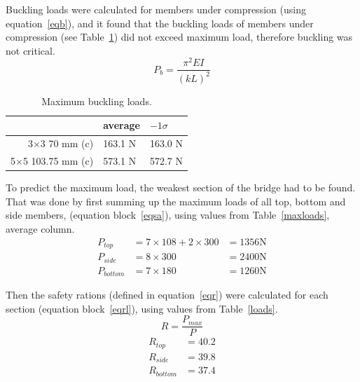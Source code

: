 \documentclass[12pt]{article}
\begin{document}
		Buckling loads were calculated for members under compression (using equation~\ref{eqb}), and it found that the buckling loads of members under compression (see Table~\ref{buck}) did not exceed maximum load, therefore buckling was not critical.
		\begin{equation}
			P_b=\frac{\pi^2 E I}{(kL)^2}
			\label{eqb}
		\end{equation}
		\begin{table}[h!]
			\caption{Maximum buckling loads.}
			\begin{center}
			\begin{tabular}{ | r | l | l | }
				\hline
				& average & $-1\sigma$ \\ \hline
				3$\times$3 70 mm (c) & 163.1 N & 163.0 N \\ \hline
				5$\times$5 103.75 mm (c) & 573.1 N & 572.7 N \\ \hline
			\end{tabular}
			\end{center}
			\label{buck}
		\end{table}

		To predict the maximum load, the weakest section of the bridge had to be found. That was done by first summing up the maximum loads of all top, bottom and side members, (equation block~\ref{eqsa}), using values from Table~\ref{maxloads}, average column.
		\begin{subequations}
			\begin{align}
				P_{top}&=7\times108+2\times300
				&=1356\mathrm{N}\\
				P_{side}&=8\times300
				&=2400\mathrm{N}\\
				P_{bottom}&=7\times180
				&=1260\mathrm{N}
			\end{align}
			\label{eqsa}
		\end{subequations}

		Then the safety rations (defined in equation~\ref{eqr}) were calculated for each section (equation block~\ref{eqrl}), using values from Table~\ref{loads}.
		\begin{equation}
			R=\frac{P_{max}}{P}
			\label{eqr}
		\end{equation}
		\begin{subequations}
			\begin{align}
				R_{top}&=40.2\\
				R_{side}&=39.8\\
				R_{bottom}&=37.4
			\end{align}
			\label{eqrl}
		\end{subequations}
\end{document}
